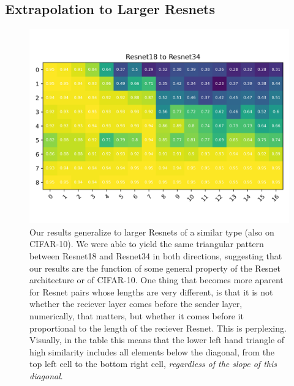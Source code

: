 \documentclass{article}
\begin{document}
\subsection*{Extrapolation to Larger Resnets}
\begin{center}
  \begin{figure}[H]
     \centering
     \includegraphics[width=14cm]{bigboi.png}
     \caption{Our results generalize to larger Resnets of a similar type (also on CIFAR-10).
     We were able to yield the same triangular pattern between Resnet18 and Resnet34 in both
     directions, suggesting that our results are the function of some general property of the
     Resnet architecture or of CIFAR-10. One thing that becomes more aparent for Resnet
     pairs whose lengths are very different, is that it is not whether the reciever layer comes
     before the sender layer, numerically, that matters, but whether it comes before it proportional
     to the length of the reciever Resnet. This is perplexing. Visually, in the table this means
     that the lower left hand triangle of high similarity includes all elements below the diagonal,
     from the top left cell to the bottom right cell, \textit{regardless of the slope of this diagonal}.}
  \end{figure}
\end{center}
\end{document}
